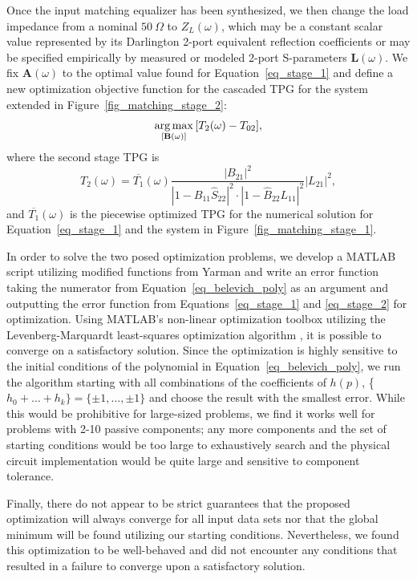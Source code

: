 	Once the input matching equalizer has been synthesized, we then change the load impedance from a nominal $50~\Omega$ to $Z_L(\omega)$, which may be a constant scalar value represented by its Darlington 2-port equivalent reflection coefficients \cite{yarman2010design} or may be specified empirically by measured or modeled 2-port S-parameters $\textbf{L}(\omega)$.
	We fix $\textbf{A}(\omega)$ to the optimal value found for Equation~\ref{eq_stage_1} and define a new optimization objective function for the cascaded \ac{TPG} for the system extended in Figure~\ref{fig_matching_stage_2}:
\begin{equation} \label{eq_stage_2}
	\argmax_{[\textbf{B}(\omega)]}{[T_2(\omega) - T_{02}]},
\end{equation}
where the second stage \ac{TPG} is
\begin{equation} \label{eq_stage_2_tpg}
	{T_2(\omega)} = \overbar{T_1}(\omega)\frac{|B_{21}|^2}{|1-B_{11}\hat{S}_{22}|^2\cdot|1-\hat{B}_{22}L_{11}|^2}|L_{21}|^2,
\end{equation}
and $\overbar{T_1}(\omega)$ is the piecewise optimized \ac{TPG} for the numerical solution for Equation~\ref{eq_stage_1} and the system in Figure~\ref{fig_matching_stage_1}.

	In order to solve the two posed optimization problems, we develop a MATLAB script utilizing modified functions from Yarman \cite{yarman2010design} and write an error function taking the numerator from Equation~\ref{eq_belevich_poly} as an argument and outputting the error function from Equations~\ref{eq_stage_1} and \ref{eq_stage_2} for optimization.
	Using MATLAB's non-linear optimization toolbox utilizing the Levenberg-Marquardt least-squares optimization algorithm \cite{hansen2013least}, it is possible to converge on a satisfactory solution.
	Since the optimization is highly sensitive to the initial conditions of the polynomial in Equation~\ref{eq_belevich_poly}, we run the algorithm starting with all combinations of the coefficients of $h(p)$, \{$h_0 + \ldots + h_k\} = \{\pm 1, \ldots , \pm 1 \}$ and choose the result with the smallest error.
	While this would be prohibitive for large-sized problems, we find it works well for problems with 2-10 passive components; any more components and the set of starting conditions would be too large to exhaustively search and the physical circuit implementation would be quite large and sensitive to component tolerance.
	
	Finally, there do not appear to be strict guarantees that the proposed optimization will always converge for all input data sets nor that the global minimum will be found utilizing our starting conditions.
	Nevertheless, we found this optimization to be well-behaved and did not encounter any conditions that resulted in a failure to converge upon a satisfactory solution.
	
